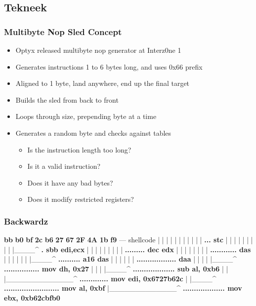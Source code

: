 \documentclass{beamer}
\newenvironment{sitemize}{\vspace{1mm}\begin{itemize}\itemsep 4pt\small}{\end{itemize}}
\begin{document}
\subsection{Tekneek}

\begin{frame}[t]
  \frametitle{Multibyte Nop Sled Concept}
  \begin{sitemize}
    \item Optyx released multibyte nop generator at Interz0ne 1
    \item Generates instructions 1 to 6 bytes long, and uses 0x66 prefix
    \item Aligned to 1 byte, land anywhere, end up the final target
  \end{sitemize}
  \begin{sitemize}
    \pause
    \item Builds the sled from back to front
    \item Loops through size, prepending byte at a time
    \item Generates a random byte and checks against tables
    \pause
    \begin{sitemize}
      \item Is the instruction length too long?
      \item Is it a valid instruction?
      \item Does it have any bad bytes?
      \item Does it modify restricted registers?
    \end{sitemize}
  \end{sitemize}
\end{frame}

\begin{frame}[fragile]
  \frametitle{Backwardz}
  {\footnotesize
  \begin{semiverbatim}
  \textbf<11>{bb} \textbf<10,11>{b0} \textbf<9,10,11>{bf} \textbf<8,9,11>{2c} \textbf<7,8,9,11>{b6} \textbf<6,7,9>{27} \textbf<5,9>{67} \textbf<4,5>{2F} \textbf<3>{4A} \textbf<2>{1b} \textbf<1,2>{f9} --- shellcode
  |  |  |  |  |  |  |  |  |  |  | \textbf<1>{... stc}
  |  |  |  |  |  |  |  |  |  |____^ \textbf<2>{. sbb edi,ecx}
  |  |  |  |  |  |  |  |  | \textbf<3>{......... dec edx}
  |  |  |  |  |  |  |  | \textbf<4>{............ das}
  |  |  |  |  |  |  |____^ \textbf<5>{.......... a16 das}
  |  |  |  |  |  | \textbf<6>{.................. daa}
  |  |  |  |  |____^ \textbf<7>{................ mov dh, 0x27}
  |  |  |  |____^ \textbf<8>{................... sub al, 0xb6}
  |  |  |_____________^ \textbf<9>{............. mov edi, 0x6727b62c}
  |  |____^ \textbf<10>{......................... mov al, 0xbf}
  |_____________^ \textbf<11>{................... mov ebx, 0xb62cbfb0}
\end{semiverbatim}
}
\end{frame}
\end{document}
